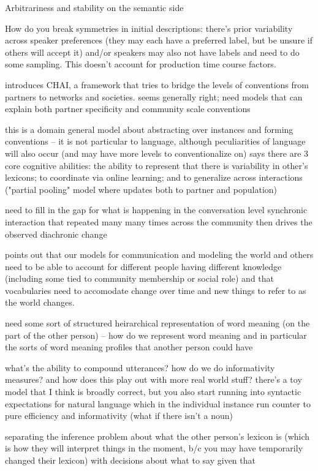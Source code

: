 \documentclass[]{article}
\begin{document}
Arbitrariness and stability on the semantic side 

\cite{hawkins2020b} How do you break symmetries in initial descriptions: there's prior variability across speaker preferences (they may each have a preferred label, but be unsure if others will accept it) and/or speakers may also not have labels and need to do some sampling. This doesn't account for production time course factors. 

\cite{hawkins2021} introduces CHAI, a framework that tries to bridge the levels of conventions from partners to networks and societies. seems generally right; need models that can explain both partner specificity and community scale conventions

this is a domain general model about abstracting over instances and forming conventions -- it is not particular to language, although peculiarities of language will also occur (and may have more levels to conventionalize on) 
\cite{hawkins2021} says there are 3 core cognitive abilities: the ability to represent that there is variability in other's lexicons; to coordinate via online learning; and to generalize across interactions ("partial pooling" model where updates both to partner and population) 

need to fill in the gap for what is happening in the conversation level synchronic interaction that repeated many many times across the community then drives the observed diachronic change 

\cite{hawkins2021} points out that our models for communication and modeling the world and others need to be able to account for different people having different knowledge (including some tied to community membership or social role) and that vocabularies need to accomodate change over time and new things to refer to as the world changes. 


need some sort of structured heirarchical representation of word meaning (on the part of the other person) -- how do we represent word meaning and in particular the sorts of word meaning profiles that another person could have 

what's the ability to compound utterances? how do we do informativity measures? and how does this play out with more real world stuff? there's a toy model that I think is broadly correct, but you also start running into syntactic expectations for natural language which in the individual instance run counter to pure efficiency and informativity (what if there isn't a noun) 

\cite{hawkins2021} separating the inference problem about what the other person's lexicon is (which is how they will interpret things in the moment, b/c you may have temporarily changed their lexicon) with decisions about what to say given that 
\end{document}
